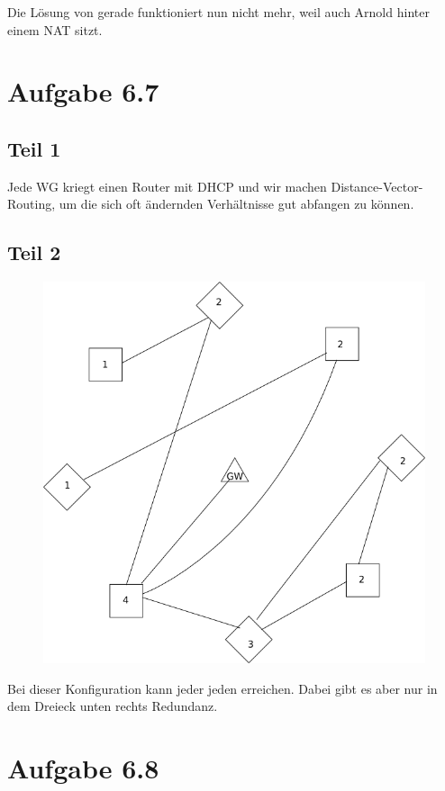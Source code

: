 \documentclass[10pt,a4paper]{article}
\begin{document}
Die Lösung von gerade funktioniert nun nicht mehr, weil auch Arnold hinter einem
NAT sitzt.

\section{Aufgabe 6.7}

\subsection{Teil 1}

Jede WG kriegt einen Router mit DHCP und wir machen Distance-Vector-Routing, um
die sich oft ändernden Verhältnisse gut abfangen zu können.

\subsection{Teil 2}

\begin{figure}[h]
  \centering
  \includegraphics[width=350pt]{6_7_b}
\end{figure}
Bei dieser Konfiguration kann jeder jeden erreichen. Dabei gibt es aber nur in
dem Dreieck unten rechts Redundanz.

\section{Aufgabe 6.8}
\end{document}

